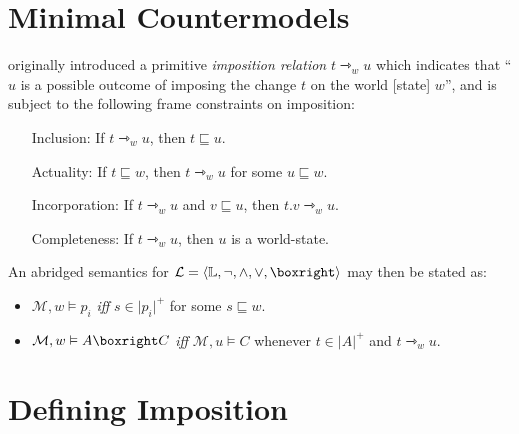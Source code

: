 \documentclass[a4paper, 11pt]{article} %
\theoremstyle{Pthm}
\newcommand{\tuple}[1]{\langle#1\rangle} %
\renewcommand{\vert}[1]{\lvert#1\rvert}
\begin{document}
\section*{Minimal Countermodels}%

\cite{Fine2012a} originally introduced a primitive \textit{imposition relation} $t \rightarrowtriangle_w u$ which indicates that ``$u$ is a possible outcome of imposing the change $t$ on the world [state] $w$'', and is subject to the following frame constraints on imposition:
  \begin{enumerate}[leftmargin=1.7in, itemsep=.05in]
    \item[\sc Inclusion:] If $t \rightarrowtriangle_w u$, then $t \sqsubseteq u$.
    \item[\sc Actuality:] If $t \sqsubseteq w$, then $t \rightarrowtriangle_w u$ for some $u \sqsubseteq w$. 
    \item[\sc Incorporation:] If $t \rightarrowtriangle_w u$ and $v \sqsubseteq u$, then $t.v \rightarrowtriangle_w u$. 
    \item[\sc Completeness:] If $t \rightarrowtriangle_w u$, then $u$ is a world-state. 
  \end{enumerate}
An abridged semantics for $\mathcal{L} = \tuple{\mathbb{L}, \neg, \wedge, \vee, \boxright}$ may then be stated as:
  \begin{itemize}[leftmargin=.5in, itemsep=.05in]
    \item $\mathcal{M}, w \vDash p_i$ \textit{iff} $s \in \vert{p_i}^+$ for some $s \sqsubseteq w$. 
    \item $\mathcal{M}, w \vDash A \boxright C$ \textit{iff} $\mathcal{M}, u \vDash C$ whenever $t \in \vert{A}^+$ and $t \rightarrowtriangle_w u$.
  \end{itemize}







\section*{Defining Imposition}%
\end{document}
